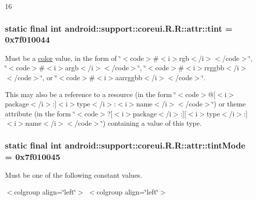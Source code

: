 16\hypertarget{classandroid_1_1support_1_1coreui_1_1_r_1_1attr_5dfdb077a9d218a030522a1bf3a80b0f}{
\subsubsection[{tint}]{\setlength{\rightskip}{0pt plus 5cm}static final int android::support::coreui.R.R::attr::tint = 0x7f010044}}
\label{classandroid_1_1support_1_1coreui_1_1_r_1_1attr_5dfdb077a9d218a030522a1bf3a80b0f}


Must be a \hyperlink{classandroid_1_1support_1_1coreui_1_1_r_1_1color}{color} value, in the form of \char`\"{}$<$code$>$\#$<$i$>$rgb$<$/i$>$$<$/code$>$\char`\"{}, \char`\"{}$<$code$>$\#$<$i$>$argb$<$/i$>$$<$/code$>$\char`\"{}, \char`\"{}$<$code$>$\#$<$i$>$rrggbb$<$/i$>$$<$/code$>$\char`\"{}, or \char`\"{}$<$code$>$\#$<$i$>$aarrggbb$<$/i$>$$<$/code$>$\char`\"{}. 

This may also be a reference to a resource (in the form \char`\"{}$<$code$>$@\mbox{[}$<$i$>$package$<$/i$>$:\mbox{]}$<$i$>$type$<$/i$>$:$<$i$>$name$<$/i$>$$<$/code$>$\char`\"{}) or theme attribute (in the form \char`\"{}$<$code$>$?\mbox{[}$<$i$>$package$<$/i$>$:\mbox{]}\mbox{[}$<$i$>$type$<$/i$>$:\mbox{]}$<$i$>$name$<$/i$>$$<$/code$>$\char`\"{}) containing a value of this type. \hypertarget{classandroid_1_1support_1_1coreui_1_1_r_1_1attr_c4204d687199c24610b08bc3d0869dc3}{
\subsubsection[{tintMode}]{\setlength{\rightskip}{0pt plus 5cm}static final int android::support::coreui.R.R::attr::tintMode = 0x7f010045}}
\label{classandroid_1_1support_1_1coreui_1_1_r_1_1attr_c4204d687199c24610b08bc3d0869dc3}


Must be one of the following constant values. \begin{TabularC}{0}
\hline
\end{TabularC}
$<$colgroup align=\char`\"{}left\char`\"{}$>$ $<$colgroup align=\char`\"{}left\char`\"{}$>$ 

